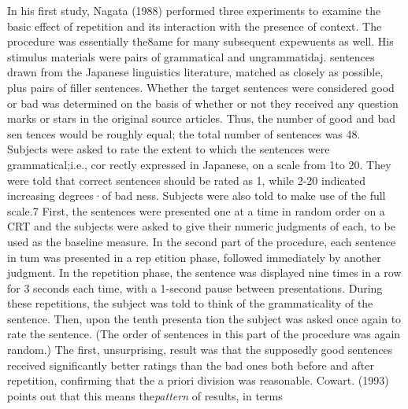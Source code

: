 \begin{styleStandard}
In his first study, Nagata (1988) performed three experiments to examine the basic effect of repetition and its interaction with the presence of context. The procedure was essentially the{\textquotesingle}8ame for many subsequent expewuents as well. His stimulus materials were pairs of grammatical and ungrammatid{\textquotesingle}aj. sentences drawn from the Japanese linguistics literature, matched as closely as possible, plus pairs of filler sentences. Whether the target sentences were considered good or bad was determined on the basis of whether or not they received any question marks or stars in the original source articles. Thus, the number of good and bad sen\- tences would be roughly equal; the total number of sentences was 48. Subjects were asked to rate the extent to which the sentences were grammatical;i.e., {\textquotedbl}cor\- rectly expressed in Japanese,{\textquotedbl} on a scale from 1to 20. They were told that correct sentences should be rated as 1, while 2-20 indicated increasing degrees·of bad\- ness. Subjects were also told to make use of the full scale.7 First, the sentences were presented one at a time in random order on a CRT and the subjects were asked to give their numeric judgments of each, to be used as the baseline measure. In the second part of the procedure, each sentence in tum was presented in a rep\- etition phase, followed immediately by another judgment. In the repetition phase, the sentence was displayed nine times in a row for 3 seconds each time, with a 1-second pause between presentations. During these repetitions, the subject was told to think of the grammaticality of the sentence. Then, upon the tenth presenta\- tion the subject was asked once again to rate the sentence. (The order of sentences in this part of the procedure was again random.) The first, unsurprising, result was that the supposedly good sentences received significantly better ratings than the bad ones both before and after repetition, confirming that the a priori division was reasonable. Cowart. (1993) points out that this means the\textit{pattern}\textit{ }of results, in terms
\end{styleStandard}


